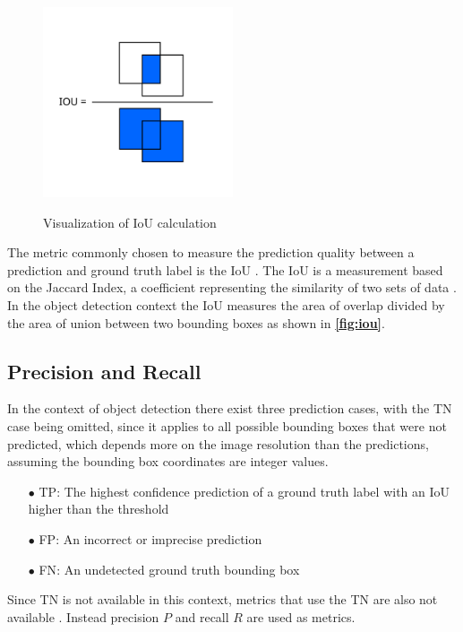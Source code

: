 \documentclass[10pt]{book}
\newcommand{\figureref}[1]{\textbf{\autoref{#1}}}
\begin{document}
\begin{figure}
  \caption{Visualization of \ac{IoU} calculation}
  \includegraphics[width=0.5\textwidth]{image/iou}
  \label{fig:iou}
\end{figure}

The metric commonly chosen to measure the prediction quality between a prediction and ground truth label is the \ac{IoU} \cite{padilla2020survey}. The \ac{IoU} is a measurement based on the  Jaccard Index, a coefficient representing the similarity of two sets of data \cite{jaccard1901etude}. In the object detection context the \ac{IoU} measures the area of overlap divided by the area of union between two bounding boxes as shown in \figureref{fig:iou}.

\subsection{Precision and Recall}

In the context of object detection there exist three prediction cases, with the \ac{TN} case being omitted, since it applies to all possible bounding boxes that were not predicted, which depends more on the image resolution than the predictions, assuming the bounding box coordinates are integer values.

\begin{itemize}
  \item[$\bullet$] \ac{TP}: The highest confidence prediction of a ground truth label with an \ac{IoU} higher than the threshold
  \item[$\bullet$] \ac{FP}: An incorrect or imprecise prediction
  \item[$\bullet$] \ac{FN}: An undetected ground truth bounding box
\end{itemize}

Since \ac{TN} is not available in this context, metrics that use the \ac{TN} are also not available \cite{padilla2020survey}. Instead precision $P$ and recall $R$ are used as metrics.
\end{document}
